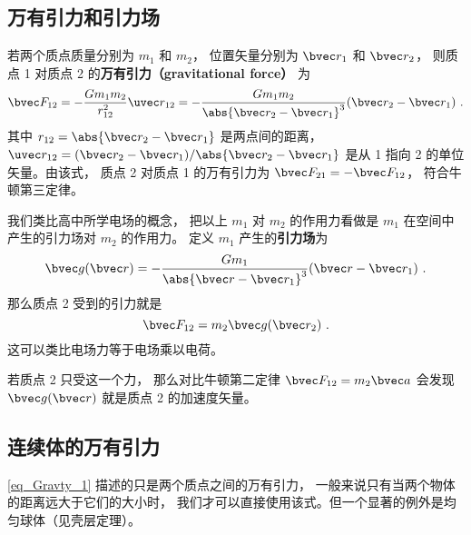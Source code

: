 

\subsection{万有引力和引力场}

若两个质点质量分别为 $m_1$ 和 $m_2$， 位置矢量分别为 $\bvec r_1$ 和 $\bvec r_2$， 则质点 1 对质点 2 的\textbf{万有引力（gravitational force）} 为
\begin{equation}\label{eq_Gravty_1}
\bvec F_{12} =  - \frac{G m_1 m_2}{r_{12}^2} \uvec r_{12} = - \frac{G m_1 m_2}{\abs{\bvec r_2 - \bvec r_1}^3}(\bvec r_2 - \bvec r_1)~.
\end{equation}
其中 $r_{12} = \abs{\bvec r_2 - \bvec r_1}$ 是两点间的距离，$\uvec r_{12} = (\bvec r_2 - \bvec r_1)/\abs{\bvec r_2 - \bvec r_1}$ 是从 1 指向 2 的单位矢量。由该式， 质点 2 对质点 1 的万有引力为 $\bvec F_{21} = -\bvec F_{12}$， 符合牛顿第三定律。

我们类比高中所学电场的概念， 把以上 $m_1$ 对 $m_2$ 的作用力看做是 $m_1$ 在空间中产生的引力场对 $m_2$ 的作用力。 定义 $m_1$ 产生的\textbf{引力场}为
\begin{equation}\label{eq_Gravty_2}
\bvec g(\bvec r) = -\frac{Gm_1}{\abs{\bvec r - \bvec r_1} ^3}(\bvec r - \bvec r_1)~.
\end{equation}
那么质点 2 受到的引力就是
\begin{equation}
\bvec F_{12} =  m_2\bvec g(\bvec r_2)~.
\end{equation}
这可以类比电场力等于电场乘以电荷。

若质点 2 只受这一个力， 那么对比牛顿第二定律 $\bvec F_{12} =  m_2\bvec a$ 会发现 $\bvec g(\bvec r)$ 就是质点 2 的加速度矢量。

\subsection{连续体的万有引力}
\autoref{eq_Gravty_1} 描述的只是两个质点之间的万有引力， 一般来说只有当两个物体的距离远大于它们的大小时， 我们才可以直接使用该式。但一个显著的例外是均匀球体（见壳层定理）。

